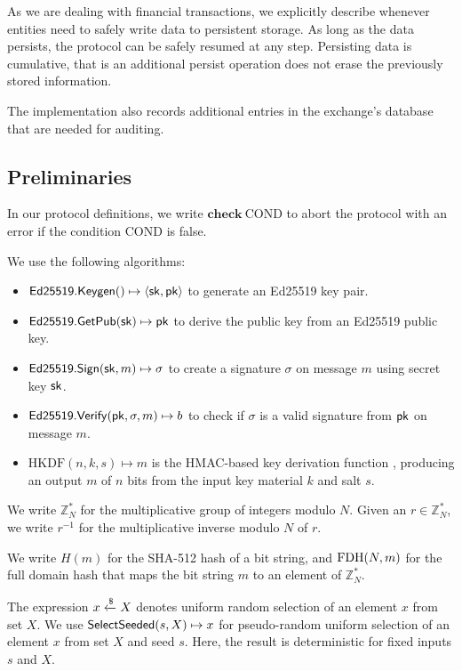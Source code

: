 As we are dealing with financial transactions, we explicitly describe whenever
entities need to safely write data to persistent storage.  As long as the data
persists, the protocol can be safely resumed at any step.  Persisting data is
cumulative, that is an additional persist operation does not erase the
previously stored information.

The implementation also records additional entries in the exchange's database
that are needed for auditing.

\subsection{Preliminaries}
In our protocol definitions, we write $\mathbf{check}\ \mathrm{COND}$ to abort
the protocol with an error if the condition $\mathrm{COND}$ is false.

We use the following algorithms:
\begin{itemize}
\item $\mathsf{Ed25519.Keygen}() \mapsto \langle \mathsf{sk}, \mathsf{pk} \rangle$
    to generate an Ed25519 key pair.
 \item $\mathsf{Ed25519.GetPub}(\mathsf{sk}) \mapsto \mathsf{pk}$ to derive the public key from
    an Ed25519 public key.
 \item $\mathsf{Ed25519.Sign}(\mathsf{sk}, m) \mapsto \sigma$ to create a signature $\sigma$
    on message $m$ using secret key $\mathsf{sk}$.
 \item $\mathsf{Ed25519.Verify}(\mathsf{pk}, \sigma, m) \mapsto b$ to check if $\sigma$ is
   a valid signature from $\mathsf{pk}$ on message $m$.
 \item $\mathrm{HKDF}(n, k, s) \mapsto m$ is the HMAC-based key derivation function \cite{rfc5869},
   producing an output $m$ of $n$ bits from the input key material $k$ and salt $s$.
\end{itemize}

We write $\mathbb{Z}^*_N$ for the multiplicative group of integers modulo $N$.
Given an $r \in \mathbb{Z}^*_N$, we write $r^{-1}$ for the multiplicative
inverse modulo $N$ of $r$.

We write $H(m)$ for the SHA-512 hash of a bit string,
and $\textrm{FDH}(N,m)$ for the full domain hash that maps the bit string $m$ to an element
of $\mathbb{Z}^*_N$.

The expression $x \xleftarrow{\text{\$}} X$ denotes uniform random selection of an element
$x$ from set $X$.  We use $\mathsf{SelectSeeded}(s, X) \mapsto x$ for pseudo-random uniform
selection of an element $x$ from set $X$ and seed $s$.  Here, the result is deterministic for fixed inputs $s$ and $X$.

